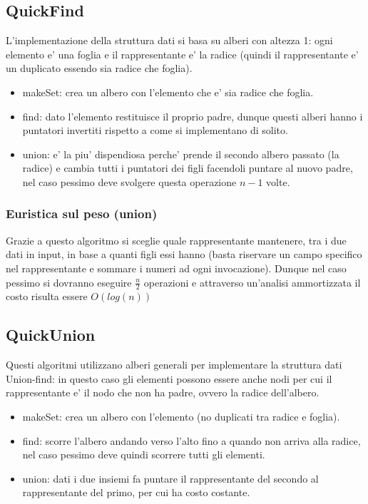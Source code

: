 \documentclass{article}
\begin{document}
\subsection{QuickFind}
L'implementazione della struttura dati si basa su alberi con altezza 1: ogni elemento e' una foglia e il rappresentante e' la radice (quindi il rappresentante e' un duplicato essendo sia radice che foglia).
\begin{itemize}
    \item makeSet: crea un albero con l'elemento che e' sia radice che foglia.
    \item find: dato l'elemento restituisce il proprio padre, dunque questi alberi hanno i puntatori invertiti rispetto a come si implementano di solito.
    \item union: e' la piu' dispendiosa perche' prende il secondo albero passato (la radice) e cambia tutti i puntatori dei figli facendoli puntare al nuovo padre, nel caso pessimo deve svolgere questa operazione $n-1$ volte.
\end{itemize}
\subsubsection{Euristica sul peso (union)}
Grazie a questo algoritmo si sceglie quale rappresentante mantenere, tra i due dati in input, in base a quanti figli essi hanno (basta riservare un campo specifico nel rappresentante e sommare i numeri ad ogni invocazione). Dunque nel caso pessimo si dovranno eseguire $\frac{n} {2}$ operazioni e attraverso un'analisi ammortizzata il costo risulta essere $O(log(n))$

\subsection{QuickUnion}
Questi algoritmi utilizzano alberi generali per implementare la struttura dati Union-find: 
in questo caso gli elementi possono essere anche nodi per cui il rappresentante e' il nodo che non ha padre, ovvero la radice dell'albero.
\begin{itemize}
    \item makeSet: crea un albero con l'elemento (no duplicati tra radice e foglia).
    \item find: scorre l'albero andando verso l'alto fino a quando non arriva alla radice, nel caso pessimo deve quindi scorrere tutti gli elementi.
    \item union: dati i due insiemi fa puntare il rappresentante del secondo al rappresentante del primo, per cui ha costo costante.
\end{itemize}
\end{document}
